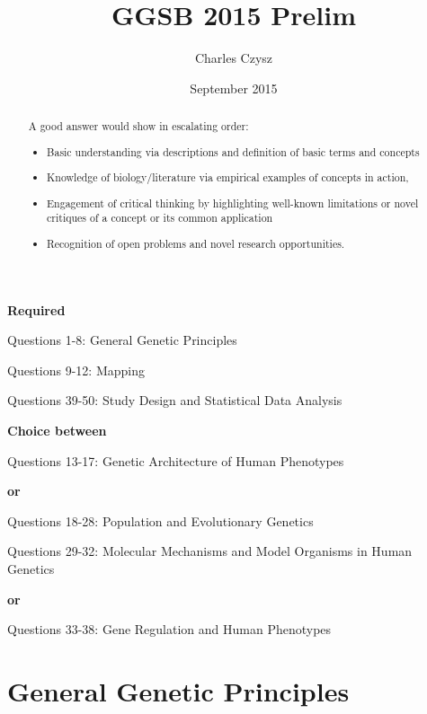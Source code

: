 \documentclass{tufte-handout}
\title{GGSB 2015 Prelim} %
\author[The Tufte-LaTeX Developers]{Charles Czysz}
\date{September 2015} %
\begin{document}
\maketitle%

\noindent
\textbf{Required}

Questions 1-8: General Genetic Principles

Questions 9-12: Mapping

Questions 39-50: Study Design and Statistical Data Analysis

\vspace*{1\baselineskip}

\noindent
\textbf{Choice between}

Questions 13-17: Genetic Architecture of Human Phenotypes

\textbf{or}

Questions 18-28: Population and Evolutionary Genetics

\vspace*{1\baselineskip}

Questions 29-32: Molecular Mechanisms and Model Organisms in Human Genetics

\textbf{or}

Questions 33-38: Gene Regulation and Human Phenotypes

\vspace*{4\baselineskip}
\begin{abstract}
\noindent
A good answer would show in escalating order: 
\begin{itemize}
\item Basic understanding via descriptions and definition of basic terms and concepts 
\item Knowledge of biology/literature via empirical examples of concepts in action, 
\item Engagement of critical thinking by highlighting well-known limitations or novel critiques of a concept or its common application 
\item Recognition of open problems and novel research opportunities.
\end{itemize}

\end{abstract}

\newpage

\tableofcontents 

\newpage
 
\section{General Genetic Principles}\label{sec:gen-genetic}
\end{document}
